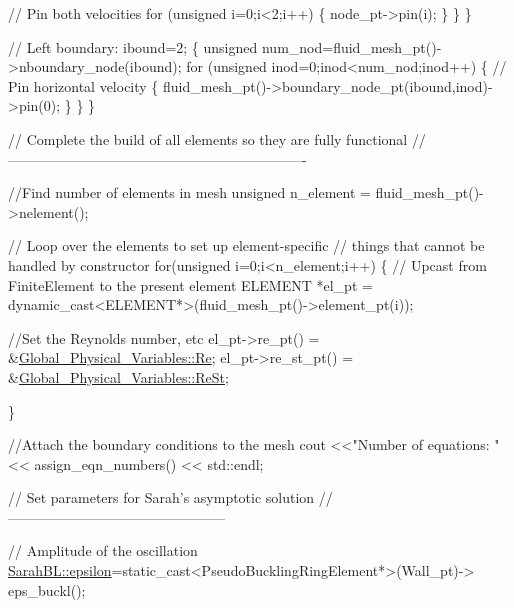\begin{DoxyCodeInclude}
     \textcolor{comment}{// Pin both velocities}
     \textcolor{keywordflow}{for} (\textcolor{keywordtype}{unsigned} i=0;i<2;i++)
      \{
       node\_pt->pin(i); 
      \}
    \}
  \}
                        
 \textcolor{comment}{// Left boundary:}
 ibound=2;
  \{
   \textcolor{keywordtype}{unsigned} num\_nod=fluid\_mesh\_pt()->nboundary\_node(ibound);
   \textcolor{keywordflow}{for} (\textcolor{keywordtype}{unsigned} inod=0;inod<num\_nod;inod++)
    \{
     \textcolor{comment}{// Pin horizontal velocity}
      \{
       fluid\_mesh\_pt()->boundary\_node\_pt(ibound,inod)->pin(0);
      \}
    \}
  \}


 \textcolor{comment}{// Complete the build of all elements so they are fully functional}
 \textcolor{comment}{//----------------------------------------------------------------}

 \textcolor{comment}{//Find number of elements in mesh}
 \textcolor{keywordtype}{unsigned} n\_element = fluid\_mesh\_pt()->nelement();

 \textcolor{comment}{// Loop over the elements to set up element-specific }
 \textcolor{comment}{// things that cannot be handled by constructor}
 \textcolor{keywordflow}{for}(\textcolor{keywordtype}{unsigned} i=0;i<n\_element;i++)
  \{
   \textcolor{comment}{// Upcast from FiniteElement to the present element}
   ELEMENT *el\_pt = \textcolor{keyword}{dynamic\_cast<}ELEMENT*\textcolor{keyword}{>}(fluid\_mesh\_pt()->element\_pt(i));

   \textcolor{comment}{//Set the Reynolds number, etc}
   el\_pt->re\_pt() = &\hyperlink{namespaceGlobal__Physical__Variables_ab814e627d2eb5bc50318879d19ab16b9}{Global\_Physical\_Variables::Re};
   el\_pt->re\_st\_pt() = &\hyperlink{namespaceGlobal__Physical__Variables_a085ee4bf968ffdd01a41b8c41864f907}{Global\_Physical\_Variables::ReSt};

  \}

 \textcolor{comment}{//Attach the boundary conditions to the mesh}
 cout <<\textcolor{stringliteral}{"Number of equations: "} << assign\_eqn\_numbers() << std::endl; 
 

 \textcolor{comment}{// Set parameters for Sarah's asymptotic solution}
 \textcolor{comment}{//-----------------------------------------------}

 \textcolor{comment}{// Amplitude of the oscillation}
 \hyperlink{namespaceoomph_1_1SarahBL_a21bfe7e71f0baa62022d1ecc9bd175de}{SarahBL::epsilon}=\textcolor{keyword}{static\_cast<}PseudoBucklingRingElement*\textcolor{keyword}{>}(Wall\_pt)->
  eps\_buckl();


\end{DoxyCodeInclude}
